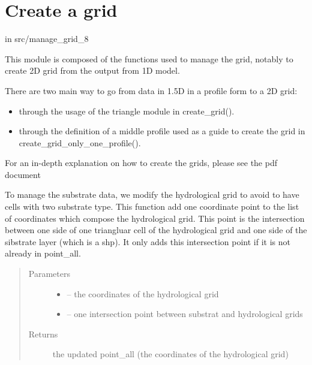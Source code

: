 \documentclass[letterpaper,10pt,english]{sphinxmanual}
\begin{document}
\section{Create a grid}
\label{\detokenize{index:create-a-grid}}
in src/manage\_grid\_8

This module is composed of the functions used to manage the grid,
notably to create 2D grid from the output from 1D model.

There are two main way to go from data in 1.5D in a profile form to a 2D grid:
\begin{itemize}
\item {} 
through the usage of the triangle module in create\_grid().

\item {} 
through the definition of a middle profile used as a guide to create the grid in create\_grid\_only\_one\_profile().

\end{itemize}

For an in-depth explanation on how to create the grids, please see the pdf document 
\label{\detokenize{index:module-src.manage_grid_8}}

\begin{fulllineitems}
\label{\detokenize{index:src.manage_grid_8.add_point}}
To manage the substrate data, we modify the hydrological grid to avoid to have cells with two substrate type.
This function add one coordinate point to the list of coordinates which compose the hydrological grid. This point
is the intersection between one side of one triangluar cell of the hydrological grid and one side of the
sibstrate layer (which is a shp). It only adds this intersection point if it is not already in point\_all.
\begin{quote}\begin{description}
\item[{Parameters}] \leavevmode\begin{itemize}
\item {} 
 -- the coordinates of the hydrological grid

\item {} 
 -- one intersection point between substrat and hydrological grids

\end{itemize}

\item[{Returns}] \leavevmode
the updated point\_all (the coordinates of the hydrological grid)

\end{description}\end{quote}

\end{fulllineitems}
\end{document}
